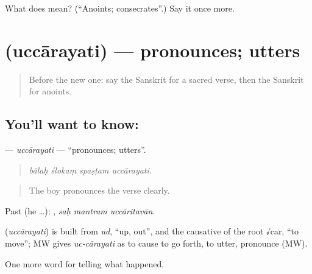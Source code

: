 \begin{tcolorbox}[breakable,colback=teal!4,colframe=teal!35!black,title={Before you move on}]
What does  mean? (\textquotedblleft{}Anoints; consecrates\textquotedblright{}.) Say it once more.
\end{tcolorbox}
\section[\texorpdfstring{\sk{उच्चारयति} (uccārayati)}{उच्चारयति (uccārayati)}]{ (uccārayati) — pronounces; utters}

\label{lesson:SA-C321-uccarayati}



\begin{quote}
Before the new one: say the Sanskrit for a sacred verse, then the Sanskrit for anoints.
\end{quote}

\subsection*{You'll want to know: }
\textbf{} — \emph{uccārayati} — \textquotedblleft{}pronounces; utters\textquotedblright{}.

\begin{quote}
   
\end{quote}

\begin{quote}
\emph{bālaḥ ślokaṃ spaṣṭam uccārayati.}
\end{quote}

\begin{quote}
The boy pronounces the verse clearly.
\end{quote}

Past (he …):   , \emph{saḥ mantram uccāritavān}.

\begin{cousinweb}
\textbf{} (\emph{uccārayati}) is built from \emph{ud}, \textquotedblleft{}up, out\textquotedblright{}, and the causative of the root √car, \textquotedblleft{}to move\textquotedblright{}; MW gives \emph{uc-cārayati} as to cause to go forth, to utter, pronounce (MW).
\end{cousinweb}

\begin{grammarlens}[title={What you've built}]
One more word for telling what happened.
\end{grammarlens}

